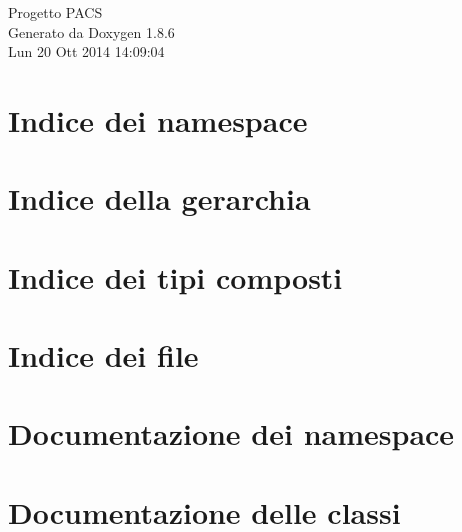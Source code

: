 \documentclass[twoside]{book}
\newcommand{\clearemptydoublepage}{%
  \newpage{\pagestyle{empty}\cleardoublepage}%
}
\begin{document}
\hypersetup{pageanchor=false}
\begin{titlepage}
\vspace*{7cm}
\begin{center}%
{\Large Progetto P\-A\-C\-S }\\
\vspace*{1cm}
{\large Generato da Doxygen 1.8.6}\\
\vspace*{0.5cm}
{\small Lun 20 Ott 2014 14:09:04}\\
\end{center}
\end{titlepage}
\clearemptydoublepage
\tableofcontents
\clearemptydoublepage
{}
\hypersetup{pageanchor=true}

\chapter{Indice dei namespace}

\chapter{Indice della gerarchia}

\chapter{Indice dei tipi composti}

\chapter{Indice dei file}

\chapter{Documentazione dei namespace}


\chapter{Documentazione delle classi}

















\end{document}
